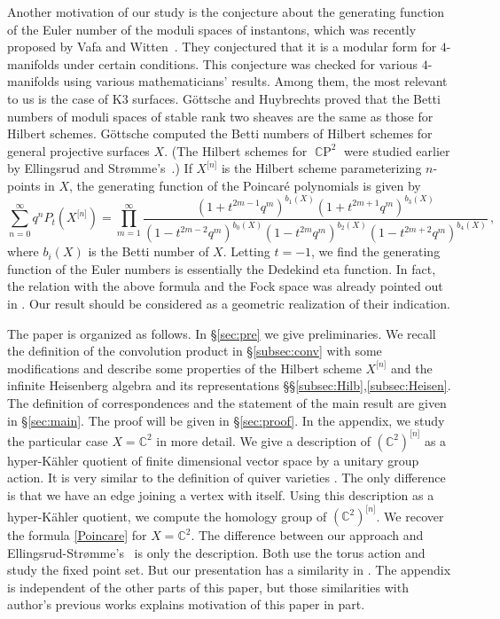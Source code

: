 \documentclass[12pt]{amsart}
\theoremstyle{definition}
\theoremstyle{remark}
\numberwithin{equation}{section}
\newcommand{\secref}[1]{\S\ref{#1}}
\newcommand{\subsecref}[1]{\S\ref{#1}}
\newcommand{\C}{{\mathbb C}}
\newcommand{\CP}{\operatorname{\C P}}
\newcommand{\Hilb}[2]{{#1}^{\lbrack{#2}\rbrack}} %
\newcommand{\Hilbn}[1]{\Hilb{#1}{n}}
\newcommand{\HilbX}[1]{\Hilb{X}{#1}}
\begin{document}
Another motivation of our study is the conjecture about the generating
function of the Euler number of the moduli spaces of instantons,
which was recently proposed by Vafa and Witten~\cite{VW}.
They conjectured that it is a modular form for $4$-manifolds under
certain conditions.
This conjecture was checked for various $4$-manifolds using
various mathematicians' results.
Among them, the most relevant to us is the case of K3 surfaces.
G\"ottsche and Huybrechts \cite{GotHu} proved that the Betti numbers
of moduli spaces of stable rank two sheaves are the same as those for
Hilbert schemes. G\"ottsche \cite{Got} computed the Betti numbers
of Hilbert schemes for general projective surfaces $X$.
(The Hilbert schemes for $\CP^2$ were studied earlier by Ellingsrud and
Str\o mme's~\cite{ES}.)
If $\Hilbn{X}$ is the Hilbert scheme parameterizing $n$-points in $X$,
the generating function of the Poincar\'e polynomials is given by
\begin{equation}
  \sum_{n=0}^\infty q^n P_t(\Hilbn{X}) = \prod_{m=1}^\infty
  \frac{(1 + t^{2m-1}q^m)^{b_1(X)}(1 + t^{2m+1}q^m)^{b_3(X)}}
       {(1 - t^{2m-2}q^m)^{b_0(X)}(1 - t^{2m}q^m)^{b_2(X)}
                 (1 - t^{2m+2}q^m)^{b_4(X)}}\, ,
\label{Poincare}\end{equation}
where $b_i(X)$ is the Betti number of $X$. Letting $t = -1$, we find
the generating function of the Euler numbers is essentially the
Dedekind eta function. In fact, the relation with the above formula
and the Fock space was already pointed out in \cite{VW}. Our result
should be considered as a geometric realization of their indication.

The paper is organized as follows.
In \secref{sec:pre} we give preliminaries. We recall the definition of
the convolution product in \subsecref{subsec:conv}
with some modifications and describe some
properties of the Hilbert scheme $\HilbX{n}$ and the infinite
Heisenberg algebra and its representations
\S\S\ref{subsec:Hilb},\ref{subsec:Heisen}.
The definition of correspondences and the statement of the main result
are given in \secref{sec:main}.
The proof will be given in \secref{sec:proof}.
In the appendix, we study the particular case $X = \C^2$ in more
detail.
We give a description
of $\Hilbn{(\C^2)}$ as a hyper-K\"ahler quotient of
finite dimensional vector space by a unitary group action.
It is very similar to the definition of quiver varieties
\cite{Na-quiver}. The only difference is that we have an edge joining
a vertex with itself.
Using this description as a hyper-K\"ahler quotient, we compute the
homology group of $\Hilbn{(\C^2)}$.
We recover the formula \eqref{Poincare} for $X = \C^2$.
The difference between our approach and
Ellingsrud-Str\o mme's~\cite{ES} is only the description.
Both use the torus action and study the fixed point set.
But our presentation has a similarity in \cite{Na-homology}.
The appendix is independent of the other parts of this paper, but
those similarities with author's previous works explains motivation of
this paper in part.
\end{document}
